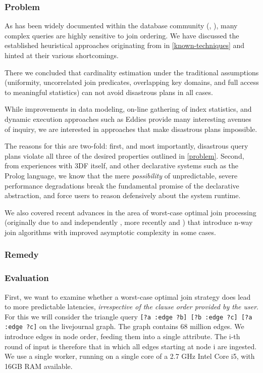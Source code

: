 \documentclass[../catalog.tex]{subfiles}
\begin{document}
\subsubsection{Problem}

As has been widely documented within the database community
(\cite{leis2015good}, \cite{lohman2014query}), many complex queries
are highly sensitive to join ordering. We have discussed the
established heuristical approaches originating from
\cite{selinger1979access} in \ref{known-techniques} and hinted at
their various shortcomings.

There we concluded that cardinality estimation under the traditional
assumptions (uniformity, uncorrelated join predicates, overlapping key
domains, and full access to meaningful statistics) can not avoid
disastrous plans in all cases.

While improvements in data modeling, on-line gathering of index
statistics, and dynamic execution approaches such as Eddies provide
many interesting avenues of inquiry, we are interested in approaches
that make disastrous plans impossible.

The reasons for this are two-fold: first, and most importantly,
disastrous query plans violate all three of the desired properties
outlined in \ref{problem}. Second, from experiences with 3DF itself,
and other declarative systems such as the Prolog language, we know
that the mere \emph{possibility} of unpredictable, severe performance
degradations break the fundamental promise of the declarative
abstraction, and force users to reason defensively about the system
runtime.

We also covered recent advances in the area of worst-case optimal join
processing (originally due to \cite{ngo2012worst} and independently
\cite{veldhuizen2012leapfrog}, more recently
\cite{ammar2018distributed} and \cite{ciucanu2015worst}) that
introduce n-way join algorithms with improved asymptotic complexity in
some cases.

\subsubsection{Remedy}

\subsubsection{Evaluation}

First, we want to examine whether a worst-case optimal join strategy
does lead to more predictable latencies, \emph{irrespective of the
  clause order provided by the user}. For this we will consider the
triangle query \texttt{[?a :edge ?b] [?b :edge ?c] [?a :edge ?c]} on
the livejournal graph. The graph contains 68 million edges. We
introduce edges in node order, feeding them into a single
attribute. The i-th round of input is therefore that in which all
edges starting at node i are ingested. We use a single worker, running
on a single core of a 2.7 GHz Intel Core i5, with 16GB RAM available.
\end{document}

